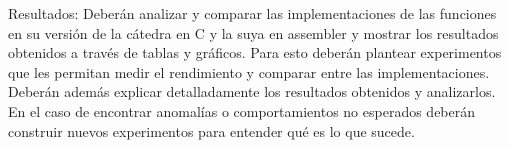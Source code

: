 Resultados: Deberán analizar y comparar las implementaciones de las funciones en su versión de la cátedra en C y la suya en assembler y mostrar los resultados obtenidos a través de tablas y gráficos. Para esto deberán plantear experimentos que les permitan medir el rendimiento y comparar entre las implementaciones. Deberán además explicar detalladamente los resultados obtenidos y analizarlos. En el caso de encontrar anomalías o comportamientos no esperados deberán construir nuevos experimentos para entender qué es lo que sucede.